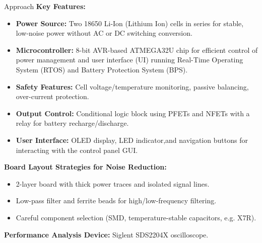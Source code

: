 \documentclass[final]{beamer}
\newlength{\colwidth}
\begin{document}
\begin{frame}[t]
\begin{columns}[t]
\begin{column}{\colwidth}
\begin{block}{Approach}
					\textbf{Key Features:}
					\begin{itemize}
						\setlength{\itemsep}{0pt}
						\setlength{\parskip}{0pt}

						\item \textbf{Power Source:} Two 18650 Li-Ion (Lithium Ion) cells in
							series for stable, low-noise power without AC or DC switching conversion.

						\item \textbf{Microcontroller:} 8-bit AVR-based ATMEGA32U chip for
							efficient control of power management and user interface (UI)
							running Real-Time Operating System (RTOS) and Battery Protection
							System (BPS).

						\item \textbf{Safety Features:} Cell voltage/temperature monitoring,
							passive balancing, over-current protection.

						\item \textbf{Output Control:} Conditional logic block using PFETs
							and NFETs with a relay for battery recharge/discharge.

						\item \textbf{User Interface:} OLED display, LED indicator,and navigation
							buttons for interacting with the control panel GUI.
					\end{itemize}

					\textbf{Board Layout Strategies for Noise Reduction:}
					\begin{itemize}
						\setlength{\itemsep}{0pt}
						\setlength{\parskip}{0pt}

						\item 2-layer board with thick power traces and isolated signal lines.

						\item Low-pass filter and ferrite beads for high/low-frequency filtering.

						\item Careful component selection (SMD, temperature-stable capacitors,
							e.g. X7R).
					\end{itemize}

					\vspace{-0.5em}
					\textbf{Performance Analysis Device:} Siglent SDS2204X oscilloscope.


\end{block}
\end{column}
\end{columns}
\end{frame}
\end{document}
